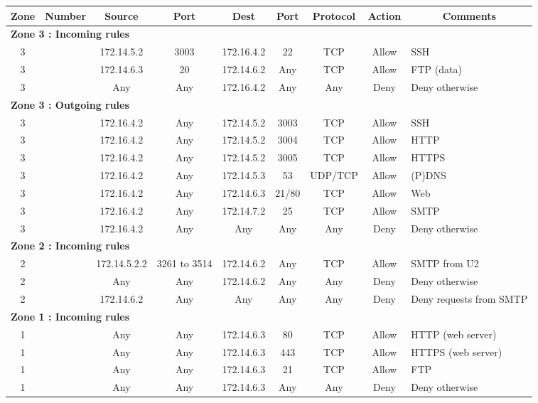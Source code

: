\documentclass[a4paper,titlepage]{article}
\begin{document}
\begin{landscape}
	\thispagestyle{empty}
	\vspace*{\fill}
	\begin{table}[h]
		\centering
		\small
		\begin{tabular}{c|c|cc|cc|ccl}
			Zone & Number & Source & Port & Dest & Port & Protocol & Action & \multicolumn{1}{c}{Comments}\\
			\hline
			\multicolumn{9}{l}{\textbf{Zone 3 : Incoming rules}}\\
			3 &  & 172.14.5.2 & 3003 & 172.16.4.2 & 22 & TCP & Allow & SSH\\
			3 &  & 172.14.6.3 & 20 & 172.14.6.2 & Any & TCP & Allow & FTP (data)\\
			3 &  & Any & Any & 172.16.4.2 & Any & Any & Deny & Deny otherwise\\

			\hline
			\multicolumn{9}{l}{\textbf{Zone 3 : Outgoing rules}}\\
			3 &  & 172.16.4.2 & Any & 172.14.5.2 & 3003 & TCP & Allow & SSH\\
			3 &  & 172.16.4.2 & Any & 172.14.5.2 & 3004 & TCP & Allow & HTTP\\
			3 &  & 172.16.4.2 & Any & 172.14.5.2 & 3005 & TCP & Allow & HTTPS\\
			3 &  & 172.16.4.2 & Any & 172.14.5.3 & 53 & UDP/TCP & Allow & (P)DNS\\
			3 &  & 172.16.4.2 & Any & 172.14.6.3 & 21/80 & TCP & Allow & Web\\
			3 &  & 172.16.4.2 & Any & 172.14.7.2 & 25 & TCP & Allow & SMTP\\
			3 &  & 172.16.4.2 & Any & Any & Any & Any & Deny & Deny otherwise\\

			\hline
			\multicolumn{9}{l}{\textbf{Zone 2 : Incoming rules}}\\
			2 &  & 172.14.5.2.2 & 3261 to 3514 & 172.14.6.2 & Any & TCP & Allow & SMTP from U2\\
			2 &  & Any & Any & 172.14.6.2 & Any & Any & Deny & Deny otherwise

			\hline
			\multicolumn{9}{l}{\textbf{Zone 2 : Outgoing rules}}\\
			2 &  & 172.14.6.2 & Any & Any & Any & Any & Deny & Deny requests from SMTP\\

			\hline
			\multicolumn{9}{l}{\textbf{Zone 1 : Incoming rules}}\\
			1 &  & Any & Any & 172.14.6.3 & 80 & TCP & Allow & HTTP (web server)\\
			1 &  & Any & Any & 172.14.6.3 & 443 & TCP & Allow & HTTPS (web server)\\
			1 &  & Any & Any & 172.14.6.3 & 21 & TCP & Allow & FTP\\
			1 &  & Any & Any & 172.14.6.3 & Any & Any & Deny & Deny otherwise\\


\end{tabular}
\end{table}
\end{landscape}
\end{document}
